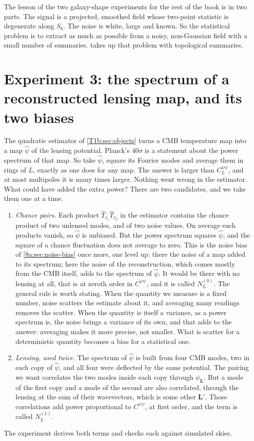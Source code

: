 The lesson of the two galaxy-shape experiments for the rest of the book is in two parts. The signal is a projected, smoothed field whose two-point statistic is degenerate along $S_8$. The noise is white, large and known. So the statistical problem is to extract as much as possible from a noisy, non-Gaussian field with a small number of summaries.  takes up that problem with topological summaries.

\section[Experiment 3: the two biases of a reconstructed lensing map]{Experiment 3: the spectrum of a reconstructed lensing map, and its two biases}
\label{T1b:sec:recon}

The quadratic estimator of \cref{T1b:sec:objects} turns a CMB temperature map into a map $\hat\psi$ of the lensing potential. Planck's $40\sigma$ is a statement about the power spectrum of that map. So take $\hat\psi$, square its Fourier modes and average them in rings of $L$, exactly as one does for any map. The answer is larger than $C^{\psi\psi}_L$, and at most multipoles it is many times larger. Nothing went wrong in the estimator. What could have added the extra power? There are two candidates, and we take them one at a time.
\begin{enumerate}[leftmargin=1.6em,itemsep=2pt]
\item \emph{Chance pairs.} Each product $\hat T_{\bm\ell_1}\hat T_{\bm\ell_2}$ in the estimator contains the chance product of two unlensed modes, and of two noise values. On average such products vanish, so $\hat\psi$ is unbiased. But the power spectrum squares $\hat\psi$, and the square of a chance fluctuation does not average to zero. This is the noise bias of \cref{8a:sec:noise-bias} once more, one level up: there the noise of a map added to its spectrum; here the noise of the reconstruction, which comes mostly from the CMB itself, adds to the spectrum of $\hat\psi$. It would be there with no lensing at all, that is at zeroth order in $C^{\psi\psi}$, and it is called $N^{(0)}_L$. The general rule is worth stating. When the quantity we measure is a fixed number, noise scatters the estimate about it, and averaging many readings removes the scatter. When the quantity is itself a variance, as a power spectrum is, the noise brings a variance of its own, and that adds to the answer: averaging makes it more precise, not smaller. What is scatter for a deterministic quantity becomes a bias for a statistical one.
\item \emph{Lensing, used twice.} The spectrum of $\hat\psi$ is built from four CMB modes, two in each copy of $\hat\psi$, and all four were deflected by the same potential. The pairing we want correlates the two modes inside each copy through $\psi_{\bm L}$. But a mode of the first copy and a mode of the second are also correlated, through the lensing at the sum of their wavevectors, which is some other $\bm L'$. Those correlations add power proportional to $C^{\psi\psi}$, at first order, and the term is called $N^{(1)}_L$.
\end{enumerate}
The experiment derives both terms and checks each against simulated skies.

